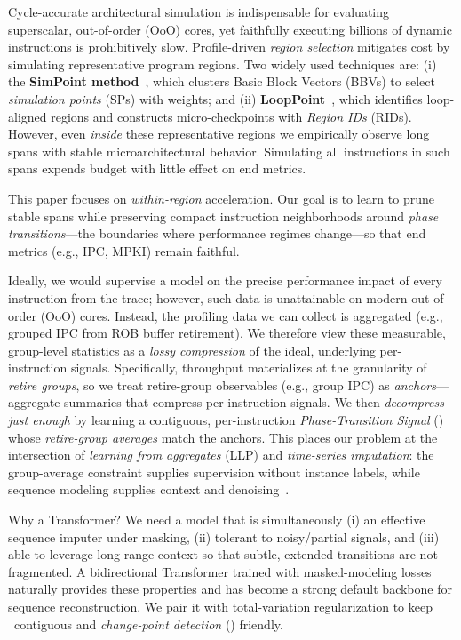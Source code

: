Cycle-accurate architectural simulation is indispensable for evaluating superscalar, out-of-order (OoO) cores, yet faithfully executing billions of dynamic instructions is prohibitively slow. Profile-driven \emph{region selection} mitigates cost by simulating representative program regions. Two widely used techniques are: (i) the \textbf{SimPoint method}~\cite{simpoint-asplos02,simpoint03,simpoint-howto}, which clusters Basic Block Vectors (BBVs) to select \emph{simulation points} (SPs) with weights; and (ii) \textbf{LoopPoint}~\cite{looppoint}, which identifies loop-aligned regions and constructs micro-checkpoints with \emph{Region IDs} (RIDs). However, even \emph{inside} these representative regions we empirically observe long spans with stable microarchitectural behavior. Simulating all instructions in such spans expends budget with little effect on end metrics.

This paper focuses on \emph{within-region} acceleration. Our  goal is to learn to prune stable spans while preserving compact instruction neighborhoods around \emph{phase transitions}—the boundaries where performance regimes change—so that end metrics (e.g., IPC, MPKI) remain faithful.

Ideally, we would supervise a model on the precise performance impact of every instruction from the trace; however, such data is unattainable on modern out-of-order (OoO) cores. Instead, the profiling data we can collect is aggregated (e.g., grouped IPC from ROB buffer retirement). We therefore view these measurable, group-level statistics as a \emph{lossy compression} of the ideal, underlying per-instruction signals. Specifically, throughput materializes at the granularity of \emph{retire groups}, so we treat retire-group observables (e.g., group IPC) as \emph{anchors}—aggregate summaries that compress per-instruction signals. We then \emph{decompress just enough} by learning a contiguous, per-instruction \emph{Phase-Transition Signal} (\pts) whose \emph{retire-group averages} match the anchors. This places our problem at the intersection of \emph{learning from aggregates} (LLP) and \emph{time-series imputation}: the group-average constraint supplies supervision without instance labels, while sequence modeling supplies context and denoising~\cite{yu2014-llp,scott2020-llp,law2018-agg,zhang2020-agg}.

Why a Transformer? We need a model that is simultaneously (i) an effective sequence imputer under masking, (ii) tolerant to noisy/partial signals, and (iii) able to leverage long-range context so that subtle, extended transitions are not fragmented. A bidirectional Transformer trained with masked-modeling losses naturally provides these properties and has become a strong default backbone for sequence reconstruction. We pair it with total-variation regularization to keep \pts\ contiguous and \emph{change-point detection} (\cpd) friendly.

